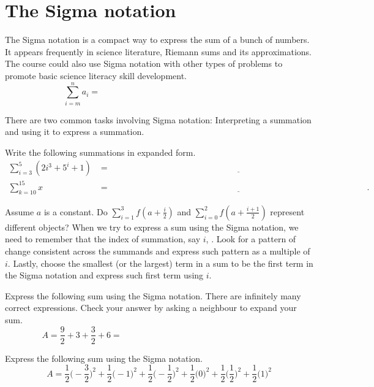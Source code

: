 \documentclass[../main.tex]{subfiles}
\begin{document}
 \section{The Sigma notation}
  The Sigma notation is a compact way to express the sum of a bunch of numbers. It appears frequently in science literature, Riemann sums and its approximations. The course could also use Sigma notation with other types of problems to promote basic science literacy skill development.
  {\huge \[ \sum_{i=m}^{n} a_{i} = \hspace{3in}\]}

  There are two common tasks involving Sigma notation: Interpreting a summation and using it to express a summation.
  \begin{example} \label{ex:sigma-notation-read)}
    Write the following summations in expanded form.
    \begin{align*}
      \sum_{i=3}^{5} (2i^{3} + 5^{i} + 1)
      &= \underline{\hspace{5in}} \\[3ex]
      \sum_{k=10}^{15} x
      &= \underline{\hspace{5in}}.
    \end{align*}
  \end{example}
  \faComment{} Assume \(a\) is a constant. Do \(\sum_{i=1}^{3}f\left(a + \frac{i}{2}\right)\) and \(\sum_{i=0}^{2}f\left(a + \frac{i+1}{2}\right)\) represent different objects? 
  \clearpage
  When we try to express a sum using the Sigma notation, we need to remember that the index of summation, say \(i\), . Look for a pattern of change consistent across the summands and express such pattern as a multiple of \(i\).  Lastly, choose the smallest (or the largest) term in a sum to be the first term in the Sigma notation and express such first term using \(i\).

  \begin{example}
    Express the following sum using the Sigma notation. There are infinitely many correct expressions. Check your answer by asking a neighbour to expand your sum.
    \[
      A = \frac{9}{2} + 3 + \frac{3}{2} + 6 = \hspace{3in}
    \]
  \end{example}

  \begin{example}
    Express the following sum using the Sigma notation. 
    \[
      A = \frac{1}{2} \bigg( -\frac{3}{2} \bigg)^{2} + \frac{1}{2} \bigg( -1 \bigg)^{2} + \frac{1}{2} \bigg( -\frac{1}{2} \bigg)^{2} + \frac{1}{2} \bigg( 0 \bigg)^{2} + \frac{1}{2} \bigg( \frac{1}{2} \bigg)^{2} + \frac{1}{2} \bigg( 1 \bigg)^{2}
    \]
  \end{example}
  \vfill
\end{document}
